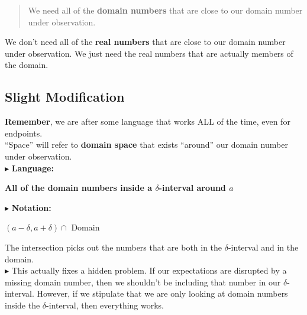 \documentclass{ximera}
\begin{document}
\begin{quote}
We need all of the \textbf{\textcolor{purple!85!blue}{domain numbers}} that are close to our domain number under observation.
\end{quote}



We don't need all of the \textbf{\textcolor{purple!70!blue}{real numbers}} that are close to our domain number under observation. We just need the real numbers that are actually members of the domain.




\subsection*{Slight Modification}


\textbf{Remember}, we are after some language that works ALL of the time, even for endpoints.   \\



``Space'' will refer to \textbf{\textcolor{red!90!darkgray}{domain space}} that exists ``around'' our domain number under observation. \\



$\blacktriangleright$ \textbf{\textcolor{purple!85!blue}{Language:}}   \\

\begin{center}
\textbf{All of the domain numbers inside a $\delta$-interval around $a$} 
\end{center}






$\blacktriangleright$ \textbf{\textcolor{purple!85!blue}{Notation:}}   \\

\begin{center}
$(a - \delta, a + \delta) \cap$ Domain
\end{center}



The intersection picks out the numbers that are both in the $\delta$-interval and in the domain. \\





$\blacktriangleright$ This actually fixes a hidden problem.  If our expectations are disrupted by a missing domain number, then we shouldn't be including that number in our $\delta$-interval.  However, if we stipulate that we are only looking at domain numbers inside the $\delta$-interval, then everything works. \\
\end{document}
